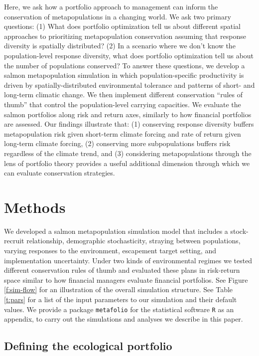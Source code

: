 Here, we ask how a portfolio approach to management can inform the
conservation of metapopulations in a changing world. We ask two primary
questions: (1) What does portfolio optimization tell us about different
spatial approaches to prioritizing metapopulation conservation assuming
that response diversity is spatially distributed? (2) In a scenario
where we don't know the population-level response diversity, what does
portfolio optimization tell us about the number of populations
conserved? To answer these questions, we develop a salmon metapopulation
simulation in which population-specific productivity is driven by
spatially-distributed environmental tolerance and patterns of short- and
long-term climatic change. We then implement different conservation
``rules of thumb'' that control the population-level carrying
capacities. We evaluate the salmon portfolios along risk and return
axes, similarly to how financial portfolios are assessed. Our findings
illustrate that: (1) conserving response diversity buffers
metapopulation risk given short-term climate forcing and rate of return
given long-term climate forcing, (2) conserving more subpopulations
buffers risk regardless of the climate trend, and (3) considering
metapopulations through the lens of portfolio theory provides a useful
additional dimension through which we can evaluate conservation
strategies.

\section{Methods}

We developed a salmon metapopulation simulation model that includes a
stock-recruit relationship, demographic stochasticity, straying between
populations, varying responses to the environment, escapement target
setting, and implementation uncertainty. Under two kinds of
environmental regimes we tested different conservation rules of thumb
and evaluated these plans in risk-return space similar to how financial
managers evaluate financial portfolios. See Figure \ref{f:sim-flow} for
an illustration of the overall simulation structure. See Table
\ref{t:pars} for a list of the input parameters to our simulation and
their default values. We provide a package \texttt{metafolio} for the
statistical software \texttt{R} \citep{r2013} as an appendix, to carry
out the simulations and analyses we describe in this paper.

\subsection{Defining the ecological portfolio}

